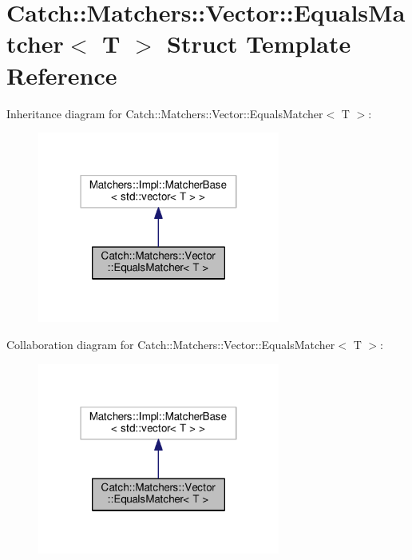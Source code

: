\hypertarget{structCatch_1_1Matchers_1_1Vector_1_1EqualsMatcher}{}\section{Catch\+:\+:Matchers\+:\+:Vector\+:\+:Equals\+Matcher$<$ T $>$ Struct Template Reference}
\label{structCatch_1_1Matchers_1_1Vector_1_1EqualsMatcher}


Inheritance diagram for Catch\+:\+:Matchers\+:\+:Vector\+:\+:Equals\+Matcher$<$ T $>$\+:\nopagebreak
\begin{figure}[H]
\begin{center}
\leavevmode
\includegraphics[width=226pt]{structCatch_1_1Matchers_1_1Vector_1_1EqualsMatcher__inherit__graph}
\end{center}
\end{figure}


Collaboration diagram for Catch\+:\+:Matchers\+:\+:Vector\+:\+:Equals\+Matcher$<$ T $>$\+:\nopagebreak
\begin{figure}[H]
\begin{center}
\leavevmode
\includegraphics[width=226pt]{structCatch_1_1Matchers_1_1Vector_1_1EqualsMatcher__coll__graph}
\end{center}
\end{figure}
